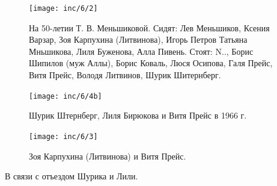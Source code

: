 \begin{figure}[ht]
    \texttt{[image: inc/6/2]}
    \caption{На 50-летии Т. В. Меньшиковой. Сидят: Лев Меньшиков, Ксения Варзар, Зоя Карпухина (Литвинова), Игорь Петров Татьяна Мньшикова, Лиля Буженова, Алла Пивень. Стоят: N.., Борис Шипилов (муж Аллы), Борис Коваль, Люся Осипова, Галя Прейс, Витя Прейс, Володя Литвинов, Шурик Шитернберг.}
\end{figure}

\begin{figure}[h!]
    \noindent
    \begin{minipage}{65mm}
        \texttt{[image: inc/6/4b]} \begin{footnotesize}Шурик Штернберг, Лиля Бирюкова и Витя Прейс в 1966 г. \end{footnotesize}
    \end{minipage}
    \hfill
    \begin{minipage}{55mm}
        \texttt{[image: inc/6/3]} \begin{footnotesize}Зоя Карпухина (Литвинова) и Витя Прейс.\end{footnotesize}
    \end{minipage}
\end{figure}

\onehalfspacing

{\raggedleft В связи с отъездом Шурика и Лили.

}

